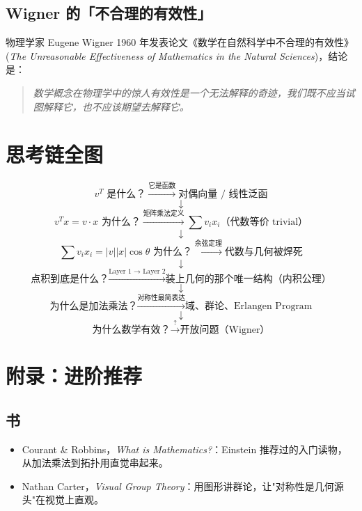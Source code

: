 \documentclass[11pt,a4paper]{article}
\begin{document}
\subsection{Wigner 的「不合理的有效性」}

物理学家 Eugene Wigner 1960 年发表论文《数学在自然科学中不合理的有效性》(\textit{The Unreasonable Effectiveness of Mathematics in the Natural Sciences})，结论是：

\begin{quote}
    \textit{数学概念在物理学中的惊人有效性是一个无法解释的奇迹，我们既不应当试图解释它，也不应该期望去解释它。}
\end{quote}

\section{思考链全图}

$$
    \boxed{v^T \text{ 是什么？}} \xrightarrow{\text{它是函数}} \boxed{\text{对偶向量 / 线性泛函}}
$$
$$
    \downarrow
$$
$$
    \boxed{v^T x = v \cdot x \text{ 为什么？}} \xrightarrow{\text{矩阵乘法定义}} \boxed{\sum v_i x_i \text{（代数等价 trivial）}}
$$
$$
    \downarrow
$$
$$
    \boxed{\sum v_i x_i = |v||x|\cos\theta \text{ 为什么？}} \xrightarrow{\text{余弦定理}} \boxed{\text{代数与几何被焊死}}
$$
$$
    \downarrow
$$
$$
    \boxed{\text{点积到底是什么？}} \xrightarrow{\text{Layer 1 → Layer 2}} \boxed{\text{装上几何的那个唯一结构（内积公理）}}
$$
$$
    \downarrow
$$
$$
    \boxed{\text{为什么是加法乘法？}} \xrightarrow{\text{对称性最简表达}} \boxed{\text{域、群论、Erlangen Program}}
$$
$$
    \downarrow
$$
$$
    \boxed{\text{为什么数学有效？}} \xrightarrow{\text{?}} \boxed{\text{开放问题（Wigner）}}
$$

\section{附录：进阶推荐}

\subsection{书}
\begin{itemize}
    \item Courant \& Robbins，\textit{What is Mathematics?}：Einstein 推荐过的入门读物，从加法乘法到拓扑用直觉串起来。
    \item Nathan Carter，\textit{Visual Group Theory}：用图形讲群论，让"对称性是几何源头"在视觉上直观。
\end{itemize}
\end{document}
